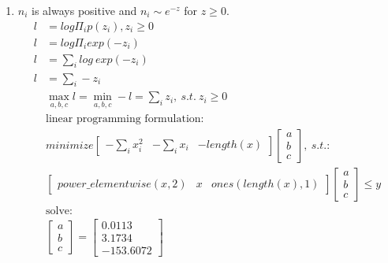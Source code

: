 \documentclass[12pt,letter]{article}
\begin{document}
\begin{enumerate}
\begin{enumerate}
\item $n_i$ is always positive and $n_i \sim e^{-z}$ for $z \geq 0$.
  \begin{align*}
    l &= log \Pi_i p(z_i), z_i \geq 0\\
    l &= log \Pi_i exp(-z_i)\\
    l &= \sum_i log\ exp(-z_i)\\
    l &= \sum_i -z_i\\
      &\max_{a,b,c} l = \min_{a,b,c} -l = \sum_i z_i,\ s.t.\ z_i \geq 0\\
      &\text{linear programming formulation:}\\
    &minimize
    \begin{bmatrix}
      -\sum_i x_i^2 & -\sum_i x_i & -length(x)
    \end{bmatrix}
                                    \begin{bmatrix}
                                      a\\b\\c
                                    \end{bmatrix},\ s.t.:\\
    &\begin{bmatrix}
      power\_elementwise(x,2) & x & ones(length(x),1)
    \end{bmatrix}
    \begin{bmatrix}
      a\\b\\c
    \end{bmatrix}
    \leq y\\
      &\text{solve:}\\
    &\begin{bmatrix}
      a\\b\\c
    \end{bmatrix} =\begin{bmatrix}0.0113 \\ 3.1734 \\ -153.6072 \end{bmatrix}
  \end{align*}


\end{enumerate}
\end{enumerate}
\end{document}
